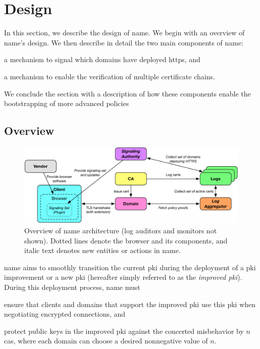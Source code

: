 \section{Design}
\label{sec:design}

In this section, we describe the design of \ac{name}. We begin with an overview
of \ac{name}'s design. We then describe in detail the two main components of
\ac{name}:
\begin{inparaenum}[(1)]
\item a mechanism to signal which domains have deployed \ac{https}, and
\item a mechanism to enable the verification of multiple certificate chains.
\end{inparaenum}
We conclude the section with a description of how these components enable the
bootstrapping of more advanced policies 

\subsection{Overview}
\label{sec:design:overview}

\begin{figure}
  \centering
  \includegraphics[width=0.8\linewidth]{fig/overview2}
  \caption{Overview of \ac{name} architecture (log auditors and monitors not
  shown). Dotted lines denote the browser and its components, and italic text
denotes new entities or actions in \ac{name}.}
  \label{fig:overview}
\end{figure}


\ac{name} aims to smoothly transition the current \ac{pki} during the deployment
of a \ac{pki} improvement or a new \ac{pki} (hereafter simply referred to as the
\emph{improved \ac{pki}}). During this deployment process, \ac{name} must
\begin{inparaenum}[(1)]
\item ensure that clients and domains that support the improved \ac{pki} use
  this \ac{pki} when negotiating encrypted connections, and
\item protect public keys in the improved \ac{pki} against the concerted
  misbehavior by $n$ \acp{ca}, where each domain can choose a desired
  nonnegative value of $n$.
\end{inparaenum}

